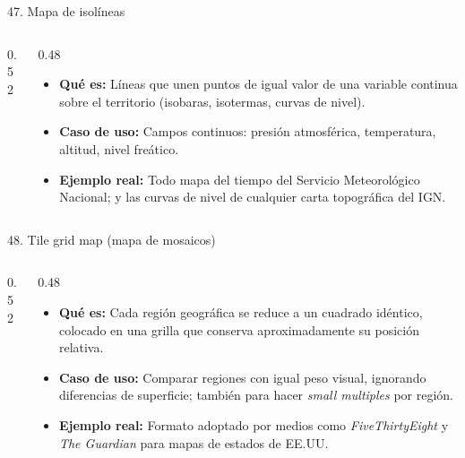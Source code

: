 \documentclass[aspectratio=169,9pt]{beamer}
\newcommand{\ficha}[3]{%
\begin{itemize}
\item \textbf{Qué es:} #1
\item \textbf{Caso de uso:} #2
\item \textbf{Ejemplo real:} #3
\end{itemize}}
\begin{document}
\begin{frame}{47. Mapa de isolíneas}
\begin{columns}[T]
\begin{column}{0.52\textwidth}
\centering
{}
\end{column}
\begin{column}{0.48\textwidth}
\ficha{Líneas que unen puntos de igual valor de una variable continua sobre el territorio (isobaras, isotermas, curvas de nivel).}
{Campos continuos: presión atmosférica, temperatura, altitud, nivel freático.}
{Todo mapa del tiempo del Servicio Meteorológico Nacional; y las curvas de nivel de cualquier carta topográfica del IGN.}
\end{column}
\end{columns}
\end{frame}

\begin{frame}{48. Tile grid map (mapa de mosaicos)}
\begin{columns}[T]
\begin{column}{0.52\textwidth}
\centering
{}
\end{column}
\begin{column}{0.48\textwidth}
\ficha{Cada región geográfica se reduce a un cuadrado idéntico, colocado en una grilla que conserva aproximadamente su posición relativa.}
{Comparar regiones con igual peso visual, ignorando diferencias de superficie; también para hacer \emph{small multiples} por región.}
{Formato adoptado por medios como \emph{FiveThirtyEight} y \emph{The Guardian} para mapas de estados de EE.UU.}
\end{column}
\end{columns}
\end{frame}
\end{document}
